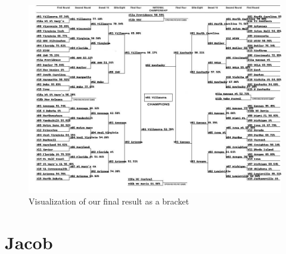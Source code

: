 \documentclass[onecolumn, draftclsnofoot,10pt, compsoc]{IEEEtran}
\begin{document}
\begin{figure}[H]
\centering
\includegraphics[width=1\textwidth]{images/bracket.jpg}
\caption{Visualization of our final result as a bracket}
\label{fig8}
\end{figure}


\section{Jacob}
\end{document}
